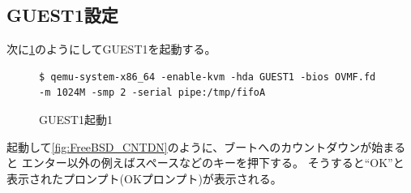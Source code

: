 \documentclass[a4j]{jarticle}
\begin{document}
\begin{multicols}{2}
\subsection{GUEST1設定}
次に\ref{fig:FreeBSD_guest1}のようにしてGUEST1を起動する。
\begin{figure}[htbp]
	\begin{center}
		\begin{lstlisting}[basicstyle=\ttfamily\footnotesize, frame=single, breaklines=true]
$ qemu-system-x86_64 -enable-kvm -hda GUEST1 -bios OVMF.fd -m 1024M -smp 2 -serial pipe:/tmp/fifoA
		\end{lstlisting}
	\end{center}
	\caption{GUEST1起動1}
	\label{fig:FreeBSD_guest1}
\end{figure}

起動して\ref{fig:FreeBSD_CNTDN}のように、ブートへのカウントダウンが始まると
エンター以外の例えばスペースなどのキーを押下する。
そうすると``OK''と表示されたプロンプト(OKプロンプト)が表示される。


\end{multicols}
\end{document}
